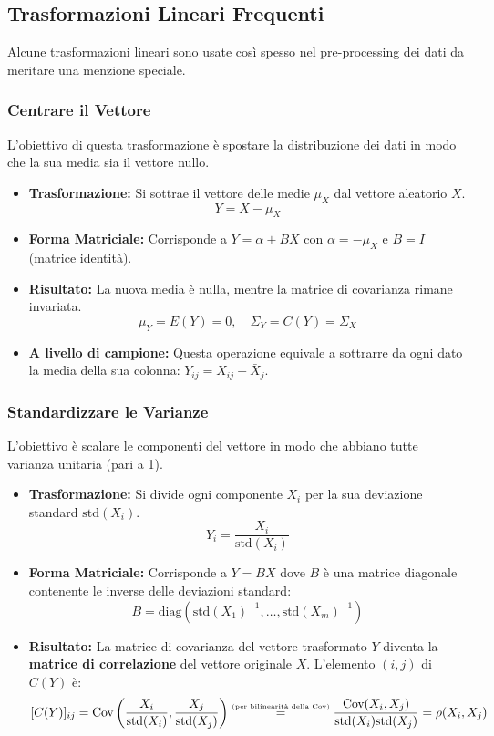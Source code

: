 \subsection{Trasformazioni Lineari Frequenti}
Alcune trasformazioni lineari sono usate così spesso nel pre-processing dei dati da meritare una menzione speciale.

\subsubsection{Centrare il Vettore}
L'obiettivo di questa trasformazione è spostare la distribuzione dei dati in modo che la sua media sia il vettore nullo.
\begin{itemize}
    \item \textbf{Trasformazione:} Si sottrae il vettore delle medie \(\mu_X\) dal vettore aleatorio \(X\).
    \[ Y = X - \mu_X \]
    \item \textbf{Forma Matriciale:} Corrisponde a \(Y = \alpha + BX\) con \(\alpha = -\mu_X\) e \(B=I\) (matrice identità).
    \item \textbf{Risultato:} La nuova media è nulla, mentre la matrice di covarianza rimane invariata.
    \[ \mu_Y = E(Y) = 0, \quad \Sigma_Y = C(Y) = \Sigma_X \]
    \item \textbf{A livello di campione:} Questa operazione equivale a sottrarre da ogni dato la media della sua colonna: \(Y_{ij} = X_{ij} - \bar{X}_j\).
\end{itemize}

\subsubsection{Standardizzare le Varianze}
L'obiettivo è scalare le componenti del vettore in modo che abbiano tutte
varianza unitaria (pari a 1).
\begin{itemize}
    \item \textbf{Trasformazione:} Si divide ogni componente \(X_i\) per la sua
    deviazione standard \(\text{std}(X_i)\).
    \[ Y_i = \frac{X_i}{\text{std}(X_i)} \]
    \item \textbf{Forma Matriciale:} Corrisponde a \(Y = BX\) dove \(B\) è una
    matrice diagonale contenente le inverse delle deviazioni standard:
    \[ B = \text{diag}(\text{std}(X_1)^{-1}, \dots, \text{std}(X_m)^{-1}) \]
\item \textbf{Risultato:} La matrice di covarianza del vettore trasformato \(Y\)
diventa la \textbf{matrice di correlazione} del vettore originale \(X\).
L'elemento \((i,j)\) di \(C(Y)\) è:
\[
    [C(Y)]_{ij} = \text{Cov}\left(\frac{X_i}{\text{std}(X_i)}, \frac{X_j}{\text{std}(X_j)}\right)
    \stackrel{\text{\tiny(per bilinearità della Cov)}}{=} \frac{\text{Cov}(X_i, X_j)}{\text{std}(X_i)\text{std}(X_j)}
    = \rho(X_i, X_j)
\]
\end{itemize}

